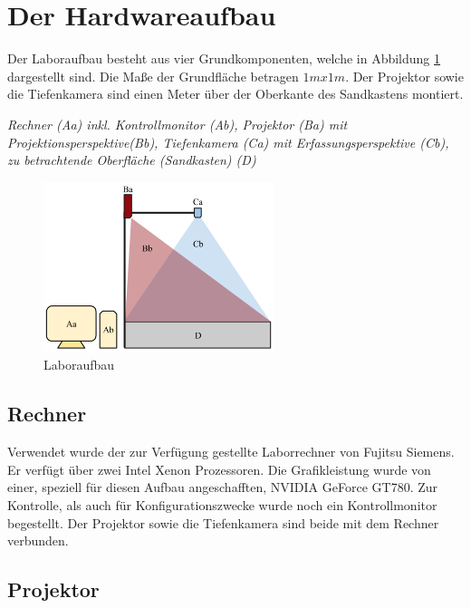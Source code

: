 \section{Der Hardwareaufbau}
\begin{Spacing}{\mylinespace}

Der Laboraufbau besteht aus vier Grundkomponenten, welche in Abbildung \ref{fig:laboraufbau} dargestellt sind. Die Maße der Grundfläche betragen $1m x 1m$. Der Projektor sowie die Tiefenkamera sind einen Meter über der Oberkante des Sandkastens montiert.

\vspace{0.2cm}
\textit{Rechner (Aa) inkl. Kontrollmonitor (Ab), Projektor (Ba) mit Projektionsperspektive(Bb), Tiefenkamera (Ca) mit Erfassungsperspektive (Cb), zu betrachtende Oberfläche (Sandkasten) (D)}

\begin{figure}[hbtp]
	\centering
	\label{fig:laboraufbau}
	\includegraphics[width=0.6\textwidth]{graphics/Aufbau.png}
	\caption{Laboraufbau}
\end{figure}

\subsection{Rechner}

Verwendet wurde der zur Verfügung gestellte Laborrechner von Fujitsu Siemens. Er verfügt über zwei Intel Xenon Prozessoren. Die Grafikleistung wurde von einer, speziell für diesen Aufbau angeschafften, NVIDIA GeForce GT780. Zur Kontrolle, als auch für Konfigurationszwecke wurde noch ein Kontrollmonitor begestellt. Der Projektor sowie die Tiefenkamera sind beide mit dem Rechner verbunden.

\subsection{Projektor}


\end{Spacing}
